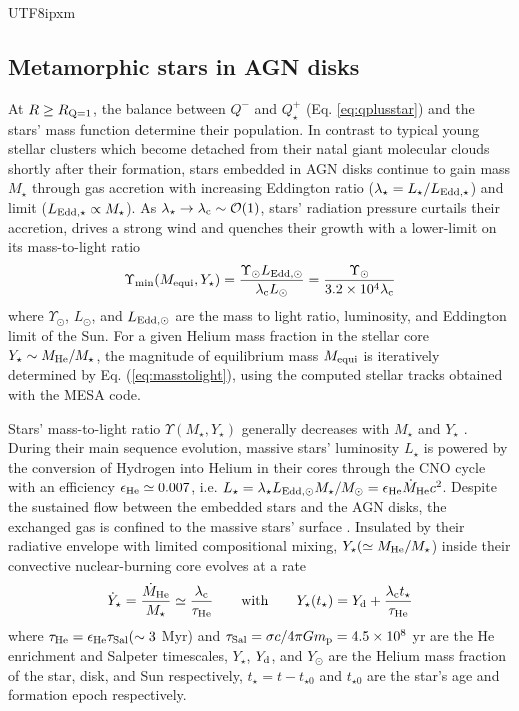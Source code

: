 \documentclass[linenumbers,trackchanges]{aastex701}
\begin{document}
\begin{CJK*}{UTF8}{ipxm}
\subsection{Metamorphic stars in AGN disks}
At $R \geq R_{\rm Q=1}$, the balance between
$Q^-$ and $Q^+ _\star$ (Eq. \ref{eq:qplusstar}) 
and the stars' mass function determine their 
population.  In contrast to typical young stellar
clusters which become detached from their natal giant 
molecular clouds shortly after their formation, 
stars embedded in AGN disks continue to gain mass
$M_\star$ through gas accretion\citep{cantiello2021, 
alidib2023} with increasing Eddington ratio
($\lambda_\star = L_\star/L_{\rm Edd, \star}$) and 
limit ($L_{\rm Edd, \star} \propto M_\star$). As $\lambda_\star 
\rightarrow \lambda_{\rm c} \sim {\mathcal O} (1)$, 
stars' radiation pressure curtails their accretion,
drives a strong wind \citep{chen2023} and quenches 
their growth with a lower-limit on its mass-to-light ratio
\begin{equation}
    \Upsilon_{\rm min} (M_{\rm equi}, Y_\star)
    = {\Upsilon_\odot L_{\rm Edd, \odot}
    \over \lambda_{\rm c} L_\odot} 
    = {\Upsilon_\odot \over 3.2 \times 10^4 \lambda_{\rm c}}
    \label{eq:masstolight}
\end{equation}
where $\Upsilon_\odot$, $L_\odot$, and $L_{\rm Edd, \odot}$ are the 
mass to light ratio, luminosity, and Eddington limit of the Sun.
For a given Helium mass fraction in the stellar core $Y_\star \sim
M_{\rm He} / M_\star$, the magnitude of equilibrium mass 
$M_{\rm equi}$ is iteratively determined by Eq.
(\ref{eq:masstolight}), using the computed stellar tracks 
obtained with the MESA code. 

Stars' mass-to-light ratio $\Upsilon 
(M_\star, Y_\star)$ generally 
decreases with $M_\star$ and $Y_\star$ 
\citep{owocki2012}.  During their main 
sequence evolution, massive stars' luminosity $L_\star$
is powered by the conversion of Hydrogen into Helium in their
cores through the CNO cycle with an efficiency $\epsilon_{\rm He} 
\simeq 0.007$, i.e. $L_\star= \lambda_\star L_{\rm Edd, \odot} 
M_\star/M_\odot = \epsilon_{\rm He} {\dot M}_{\rm He} c^2$. 
Despite the sustained flow between the embedded stars and the 
AGN disks, the exchanged gas is confined to the massive stars' 
surface \citep{chen2023}. Insulated by their radiative envelope 
with limited \citep{xu2025} compositional mixing, $Y_\star 
(\simeq M_{\rm He} / M_\star$) inside their convective  nuclear-burning core evolves at a rate
\begin{equation}
    {\dot Y}_\star = {{\dot M}_{\rm He} \over M_\star } \simeq {\lambda_{\rm c} \over \tau_{\rm He}}
    \ \ \ \ \ \ {\rm with} \ \ \ \ \ \ Y_\star (t_\star)= Y_{\rm d} + {\lambda_{\rm c} t_\star
    \over \tau_{\rm He}}  
    \label{eq:mhedot}
\end{equation}
where $\tau_{\rm He} = \epsilon_{\rm He} \tau_{\rm Sal} (\sim 3 
$ Myr) and $\tau_{\rm Sal}=\sigma c / 4 \pi G m_{\rm p} = 4.5 
\times 10^8$ yr are the He enrichment and Salpeter 
timescales, $Y_\star$, $Y_{\rm d}$, and $Y_\odot$ are the 
Helium mass fraction of the star, disk, and Sun 
respectively, $t_\star=t-t_{\star 0}$ and $t_{\star 0}$ are 
the star's age and formation epoch respectively. 
 

\end{CJK*}
\end{document}
